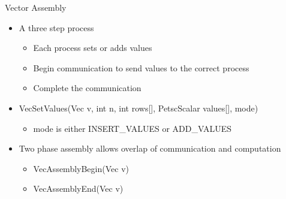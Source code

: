 \begin{frame}{Vector Assembly}

\begin{itemize}
  \item A three step process
  \begin{itemize}
    \item Each process sets or adds values
    \item Begin communication to send values to the correct process
    \item Complete the communication
  \end{itemize}

  \item {\kb VecSetValues(Vec v, int n, int rows[], PetscScalar values[], mode)}
  \begin{itemize}
    \item {\kb mode} is either INSERT\_VALUES or ADD\_VALUES
  \end{itemize}

  \item Two phase assembly allows overlap of communication and computation
  \begin{itemize}
    \item {\kb VecAssemblyBegin(Vec v)}
    \item {\kb VecAssemblyEnd(Vec v)}
  \end{itemize}
\end{itemize}

\end{frame}
